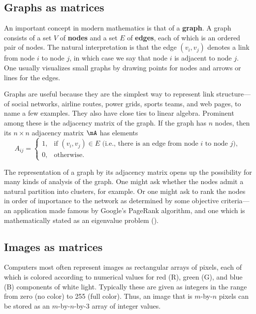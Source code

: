 \subsection{Graphs as matrices}

An important concept in modern mathematics is that of a \textbf{graph}. A graph consists of a set $V$ of  \textbf{nodes} and a set $E$ of \textbf{edges}, each of which is an ordered pair of nodes. The natural interpretation is that the edge $(v_i,v_j)$ denotes a link from node $i$ to node $j$, in which case we say that node $i$ is adjacent to node $j$. One usually visualizes small graphs by drawing points for nodes and arrows or lines for the edges.

Graphs are useful because they are the simplest way to represent link structure---of social networks, airline routes, power grids, sports teams, and web pages, to name a few examples. They also have close ties to linear algebra. Prominent among these is the   \gls{adjacency matrix} of the graph. If the graph has $n$ nodes, then its $n\times n$ adjacency matrix $\mA$ has elements
\begin{equation}
\label{eq:adjmat}
A_{ij} =
\begin{cases}
1,& \text{if $(v_i,v_j)\in E$ (i.e., there is an edge from node $i$ to node $j$)},\\
0,& \text{otherwise}.
\end{cases}
\end{equation}

\begin{exam}
\end{exam}


The representation of a graph by its adjacency matrix opens up the possibility for many kinds of analysis of the graph. One might ask whether the nodes admit a natural partition into clusters, for example. Or one might ask to rank the nodes in order of importance to the network as determined by some objective criteria---an application made famous by Google's PageRank algorithm, and one which is mathematically stated as an eigenvalue problem ().


\subsection{Images as matrices}

Computers most often represent images as rectangular arrays of pixels, each of which is colored according to numerical values for red (R), green (G), and blue (B) components of white light. Typically these are given as integers in the range from zero (no color) to 255 (full color). Thus, an image that is $m$-by-$n$ pixels can be stored as an $m$-by-$n$-by-3 array of integer values.

